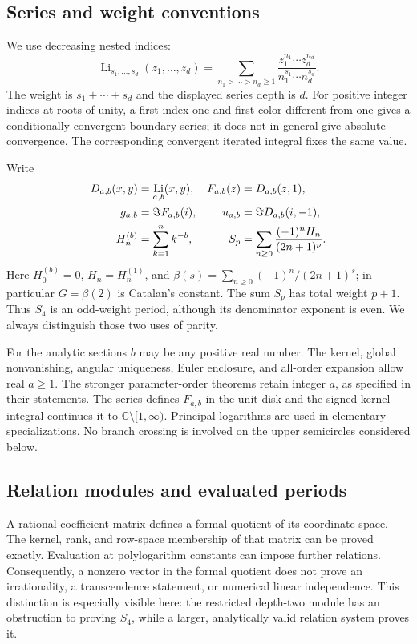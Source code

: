 \documentclass[11pt]{article}
\numberwithin{equation}{section}
\theoremstyle{plain}
\theoremstyle{definition}
\theoremstyle{remark}
\DeclareMathOperator{\Li}{Li}
\newcommand{\C}{\mathbb C}
\begin{document}
\subsection{Series and weight conventions}

We use decreasing nested indices:
\begin{equation}\label{eq:mpl}
 \Li_{s_1,\ldots,s_d}(z_1,\ldots,z_d)
 =\sum_{n_1>\cdots>n_d\ge1}
   \frac{z_1^{n_1}\cdots z_d^{n_d}}
        {n_1^{s_1}\cdots n_d^{s_d}}.
\end{equation}
The weight is $s_1+\cdots+s_d$ and the displayed series depth is $d$.
For positive integer indices at roots of unity, a first index one
and first color different from one gives a conditionally convergent
boundary series; it does not in general give absolute convergence.
The corresponding convergent iterated integral fixes the same value.

Write
\begin{align}
 D_{a,b}(x,y)&=\Li_{a,b}(x,y),&
 F_{a,b}(z)&=D_{a,b}(z,1),\notag\\
 g_{a,b}&=\Im F_{a,b}(i),&
 u_{a,b}&=\Im D_{a,b}(i,-1),\label{eq:gaussian-defs}\\
 H_n^{(b)}&=\sum_{k=1}^n k^{-b},&
 S_p&=\sum_{n\ge0}\frac{(-1)^nH_n}{(2n+1)^p}.
 \label{eq:harmonic-defs}
\end{align}
Here $H_0^{(b)}=0$, $H_n=H_n^{(1)}$, and
$\beta(s)=\sum_{n\ge0}(-1)^n/(2n+1)^s$; in particular
$G=\beta(2)$ is Catalan's constant. The sum $S_p$ has total weight
$p+1$. Thus $S_4$ is an odd-weight period, although its denominator
exponent is even. We always distinguish those two uses of parity.

For the analytic sections $b$ may be any positive real number. The
kernel, global nonvanishing, angular uniqueness, Euler enclosure, and
all-order expansion allow real $a\ge1$. The stronger parameter-order
theorems retain integer $a$, as specified in their statements.
The series defines $F_{a,b}$ in
the unit disk and the signed-kernel integral continues it to
$\C\setminus[1,\infty)$. Principal logarithms are used in elementary
specializations. No branch crossing is involved on the upper semicircles
considered below.

\subsection{Relation modules and evaluated periods}

A rational coefficient matrix defines a formal quotient of its coordinate
space. The kernel, rank, and row-space membership of that matrix can be
proved exactly. Evaluation at polylogarithm constants can impose further
relations. Consequently, a nonzero vector in the formal quotient does
not prove an irrationality, a transcendence statement, or numerical
linear independence. This distinction is especially visible here:
the restricted depth-two module has an obstruction to proving $S_4$,
while a larger, analytically valid relation system proves it.
\end{document}
